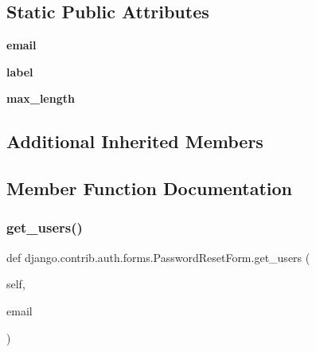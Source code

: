 \subsection*{Static Public Attributes}
\begin{DoxyCompactItemize}
\item 
\mbox{\label{classdjango_1_1contrib_1_1auth_1_1forms_1_1_password_reset_form_a70d6890c67e18d859a5eb9f60132c601}} 
{\bfseries email}
\item 
\mbox{\label{classdjango_1_1contrib_1_1auth_1_1forms_1_1_password_reset_form_a2d9a776a66998ec800391ace35674b36}} 
{\bfseries label}
\item 
\mbox{\label{classdjango_1_1contrib_1_1auth_1_1forms_1_1_password_reset_form_a8ac84db708351b781ac93d3d3aa3cd12}} 
{\bfseries max\+\_\+length}
\end{DoxyCompactItemize}
\subsection*{Additional Inherited Members}


\subsection{Member Function Documentation}
\mbox{\label{classdjango_1_1contrib_1_1auth_1_1forms_1_1_password_reset_form_a5901cf6c13e1a8b3ca34e1882c560eb0}} 
\subsubsection{\texorpdfstring{get\+\_\+users()}{get\_users()}}
{\footnotesize\ttfamily def django.\+contrib.\+auth.\+forms.\+Password\+Reset\+Form.\+get\+\_\+users (\begin{DoxyParamCaption}\item[{}]{self,  }\item[{}]{email }\end{DoxyParamCaption})}

